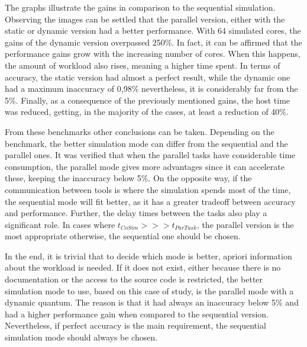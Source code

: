 The graphs illustrate the gains in comparison to the sequential simulation. Observing the images can be settled that the parallel version, either 
with the static or dynamic version had a better performance. With 64 simulated cores, the gains of the dynamic version overpassed 250\%. 
In fact, it can be affirmed that the performance gains grow with the increasing number of cores. When this happens, the amount of workload 
also rises, meaning a higher time spent. In terms of accuracy, the static version had almost a perfect result, while the dynamic one had 
a maximum inaccuracy of 0,98\% nevertheless, it is considerably far from the 5\%. Finally, as a consequence of the previously mentioned gains,
the host time was reduced, getting, in the majority of the cases, at least a reduction of 40\%. 


From these benchmarks other conclusions can be taken. Depending on the benchmark, the better simulation mode can differ from the sequential and
the parallel ones. It was verified that when the parallel tasks have considerable time consumption, the parallel mode gives more advantages 
since it can accelerate these, keeping the inaccuracy below 5\%. On the opposite way, if the communication between tools is where the simulation 
spends most of the time, the sequential mode will fit better, as it has a greater tradeoff between accuracy and performance. Further, the delay
times between the tasks also play a significant role. In cases where $t_{CoSim} >>> t_{ParTask}$, the parallel version is the most appropriate
otherwise, the sequential one should be chosen. 

In the end, it is trivial that to decide which mode is better, apriori information about the workload is needed.
If it does not exist, either because there is no documentation or the access to the source code is restricted, the better simulation mode to use, 
based on this case of study, is the parallel mode with a dynamic quantum. The reason is that it had always an inaccuracy below 5\% and 
had a higher performance gain when compared to the sequential version. Nevertheless, if perfect accuracy is the main requirement, the 
sequential simulation mode should always be chosen.


